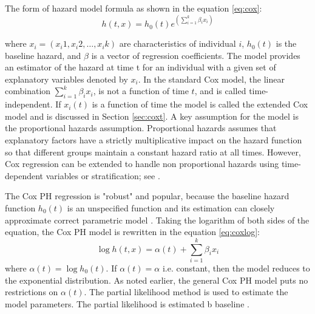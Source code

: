 \documentclass[12pt,letterpaper]{article}
\begin{document}
The form of hazard model formula as shown in the equation \ref{eq:cox}:
\begin{equation}
	\label{eq:cox}
	h(t,x)=h_0(t)e^{(\sum_{i=1}^{k}\beta_ix_i)}
\end{equation}

where $x_i=(x_i1, x_i2, \ldots, x_ik)$ are characteristics of individual $i$, $h_0(t)$ is the baseline hazard, and $\beta$  is a vector of regression coefficients.
The model provides an estimator of the hazard at time t for an individual with a given set of explanatory variables denoted by $x_i$.  In the standard Cox model, the linear combination $\sum_{i=1}^{k}\beta_i x_i$, is not a function of time $t$, and is called time-independent.  If $x_i(t)$ is a function of time the model is called the extended Cox model and is discussed in Section \ref{sec:coxt}. A key assumption for the model is the proportional hazards assumption. Proportional hazards assumes that explanatory factors have a strictly multiplicative impact on the hazard function so that different groups maintain a constant hazard ratio at all times. However, Cox regression can be extended to handle non proportional hazards using time-dependent variables or stratification; see \cite{kleinMosch2006}.

The Cox PH regression is "robust" and popular, because the baseline hazard function $h_0 (t)$ is an unspecified function and its estimation can closely approximate correct parametric model \citep{kleinbaum1998}. Taking the logarithm of both sides of the equation, the Cox PH model is rewritten in the equation \ref{eq:coxlog}:
\begin{equation}
	\label{eq:coxlog}
	\log{h(t,x)}=\alpha(t)+\sum_{i=1}^{k}\beta_ix_i
\end{equation}
where $\alpha(t)=\log{h_0(t)}$. If $\alpha(t)=\alpha$ i.e. constant, then the model reduces to the exponential distribution. As noted earlier, the general Cox PH model puts no restrictions on $\alpha(t)$.  The partial likelihood method is used to estimate the model parameters. The partial likelihood is estimated b baseline \citep{allison1995}.
\end{document}
